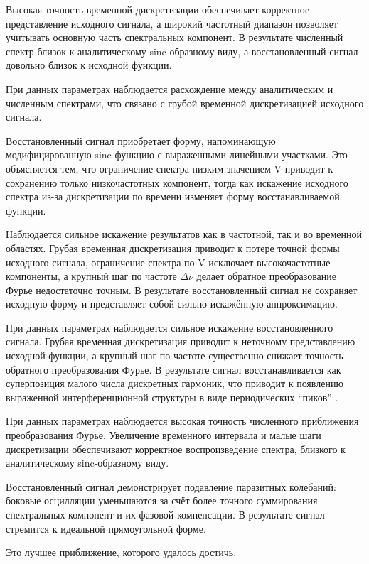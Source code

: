 \documentclass[a4paper, 12pt]{article}
\begin{document}

Высокая точность временной дискретизации обеспечивает корректное представление исходного сигнала, а широкий частотный диапазон позволяет учитывать основную часть спектральных компонент. В результате численный спектр близок к аналитическому sinc-образному виду, а восстановленный сигнал довольно близок к исходной функции.



При данных параметрах наблюдается расхождение между аналитическим и численным спектрами, что связано с грубой временной дискретизацией исходного сигнала.

Восстановленный сигнал приобретает форму, напоминающую модифицированную sinc-функцию с выраженными линейными участками. Это объясняется тем, что ограничение спектра низким значением V приводит к сохранению только низкочастотных компонент, тогда как искажение исходного спектра из-за дискретизации по времени изменяет форму восстанавливаемой функции.

Наблюдается сильное искажение результатов как в частотной, так и во временной областях. Грубая временная дискретизация приводит к потере точной формы исходного сигнала, ограничение спектра по V исключает высокочастотные компоненты, а крупный шаг по частоте $\Delta \nu$ делает обратное преобразование Фурье недостаточно точным. В результате восстановленный сигнал не сохраняет исходную форму и представляет собой сильно искажённую аппроксимацию.

При данных параметрах наблюдается сильное искажение восстановленного сигнала. Грубая временная дискретизация приводит к неточному представлению исходной функции, а крупный шаг по частоте существенно снижает точность обратного преобразования Фурье. В результате сигнал восстанавливается как суперпозиция малого числа дискретных гармоник, что приводит к появлению выраженной интерференционной структуры в виде периодических “пиков” .


При данных параметрах наблюдается высокая точность численного приближения преобразования Фурье. Увеличение временного интервала и малые шаги дискретизации обеспечивают корректное воспроизведение спектра, близкого к аналитическому sinc-образному виду.

Восстановленный сигнал демонстрирует подавление паразитных колебаний: боковые осцилляции уменьшаются за счёт более точного суммирования спектральных компонент и их фазовой компенсации. В результате сигнал стремится к идеальной прямоугольной форме.

Это лучшее приближение, которого удалось достичь.
\end{document}
